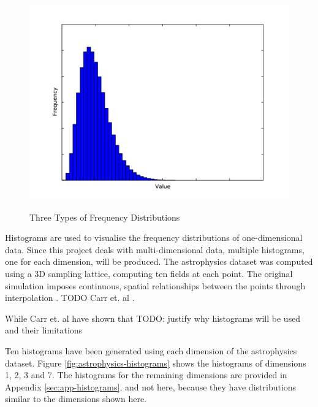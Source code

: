 \begin{figure}
\begin{center}
		\begin{subfloat} {%
			\includegraphics[scale=0.25]{figures/freqdist_gamma.pdf}
		}
		\end{subfloat}
	\end{center}

	\caption{Three Types of Frequency Distributions}
	\label{fig:frequency-distributions}
\end{figure}

Histograms are used to visualise the frequency distributions of one-dimensional data. Since this project deals with multi-dimensional data, multiple histograms, one for each dimension, will be produced. The astrophysics dataset was computed using a 3D sampling lattice, computing ten fields at each point. The original simulation imposes continuous, spatial relationships between the points through interpolation \cite{TODO}. TODO Carr et. al \cite{histograms-and-isosurfaces}.

While Carr et. al have shown that   TODO: justify why histograms will be used and their limitations

Ten histograms have been generated using each dimension of the astrophysics dataset. Figure \ref{fig:astrophysics-histograms} shows the histograms of dimensions 1, 2, 3 and 7. The histograms for the remaining dimensions are provided in Appendix \ref{sec:app-histograms}, and not here, because they have distributions similar to the dimensions shown here.

